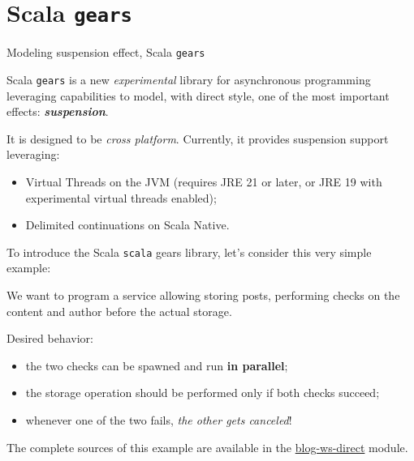 \documentclass[aspectratio=1610,xcolor=dvipsnames,handout]{beamer}
\begin{document}
\section{Scala \texttt{gears}}
\begin{frame}{Modeling suspension effect, Scala \texttt{gears} \cite{gears}}
  \begin{block}{}
    Scala \texttt{gears} is a new \textit{experimental} library for asynchronous programming leveraging capabilities to model, with direct style, one of the most important effects: \textbf{\textit{suspension}}.
  \end{block}
  It is designed to be \emph{cross platform}. Currently, it provides suspension support leveraging:
  \begin{itemize}
    \item Virtual Threads on the JVM (requires JRE 21 or later, or JRE 19 with experimental virtual threads enabled);
    \item Delimited continuations on Scala Native.
  \end{itemize}
\end{frame}
%
\begin{frame}
  To introduce the Scala \texttt{scala} gears library, let's consider this very simple example:
  \begin{example}[1]
    We want to program a service allowing storing posts, performing checks on the content and author before the actual storage.
  \end{example}
  Desired behavior:
  \begin{itemize}
    \item the two checks can be spawned and run \textbf{in parallel};
    \item the storage operation should be performed only if both checks succeed;
    \item whenever one of the two fails, \emph{the other gets canceled}!
  \end{itemize}
  \vspace*{0.5cm}
  \footnotesize
  The complete sources of this example are available in the \href{https://github.com/tassiLuca/direct-style-experiments/tree/master/blog-ws-direct}{blog-ws-direct} module.
\end{frame}
%
\end{document}
